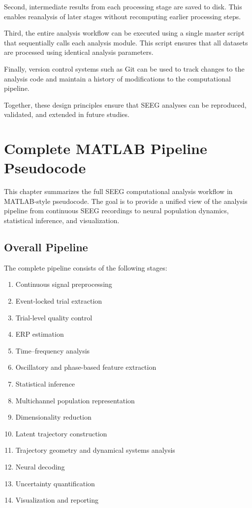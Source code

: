 \documentclass[11pt]{report}
\begin{document}
Second, intermediate results from each processing stage are
saved to disk. This enables reanalysis of later stages without
recomputing earlier processing steps.

Third, the entire analysis workflow can be executed using a
single master script that sequentially calls each analysis
module. This script ensures that all datasets are processed
using identical analysis parameters.

Finally, version control systems such as Git can be used to
track changes to the analysis code and maintain a history
of modifications to the computational pipeline.

Together, these design principles ensure that SEEG analyses
can be reproduced, validated, and extended in future studies.

\chapter{Complete MATLAB Pipeline Pseudocode}

This chapter summarizes the full SEEG computational analysis workflow
in MATLAB-style pseudocode. The goal is to provide a unified view of
the analysis pipeline from continuous SEEG recordings to neural
population dynamics, statistical inference, and visualization.

\section{Overall Pipeline}

The complete pipeline consists of the following stages:

\begin{enumerate}
\item Continuous signal preprocessing
\item Event-locked trial extraction
\item Trial-level quality control
\item ERP estimation
\item Time--frequency analysis
\item Oscillatory and phase-based feature extraction
\item Statistical inference
\item Multichannel population representation
\item Dimensionality reduction
\item Latent trajectory construction
\item Trajectory geometry and dynamical systems analysis
\item Neural decoding
\item Uncertainty quantification
\item Visualization and reporting
\end{enumerate}
\end{document}
